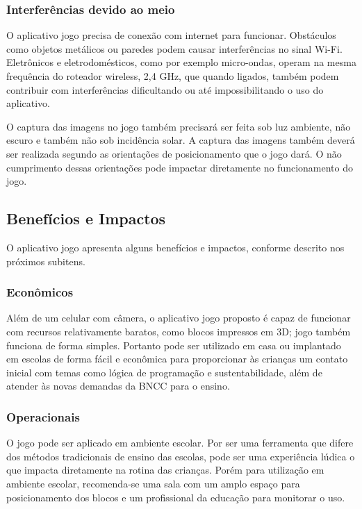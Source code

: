         \subsubsection{Interferências devido ao meio}
        O aplicativo jogo precisa de conexão com internet para funcionar. Obstáculos como objetos metálicos ou paredes podem causar interferências no sinal Wi-Fi. Eletrônicos e eletrodomésticos, como por exemplo micro-ondas, operam na mesma frequência do roteador wireless, 2,4 GHz, que quando ligados, também podem contribuir com interferências dificultando ou até impossibilitando o uso do aplicativo.
        
        O captura das imagens no jogo também precisará ser feita sob luz ambiente, não escuro e também não sob incidência solar. A captura das imagens também deverá ser realizada segundo as orientações de posicionamento que o jogo dará. O não cumprimento dessas orientações pode impactar diretamente no funcionamento do jogo.
    
    \subsection{Benefícios e Impactos}
    O aplicativo jogo apresenta alguns benefícios e impactos, conforme descrito nos próximos subitens.

        \subsubsection{Econômicos}
        Além de um celular com câmera, o aplicativo jogo proposto é capaz de funcionar com recursos relativamente baratos, como blocos impressos em 3D; jogo também funciona de forma simples. Portanto pode ser utilizado em casa ou implantado em escolas de forma fácil e econômica para proporcionar às crianças um contato inicial com temas como lógica de programação e sustentabilidade, além de atender às novas demandas da BNCC para o ensino.
        
        \subsubsection{Operacionais}
        O jogo pode ser aplicado em ambiente escolar. Por ser uma ferramenta que difere dos métodos tradicionais de ensino das escolas, pode ser uma experiência lúdica o que impacta diretamente na rotina das crianças. Porém para utilização em ambiente escolar, recomenda-se uma sala com um amplo espaço para posicionamento dos blocos e um profissional da educação para monitorar o uso.
        
